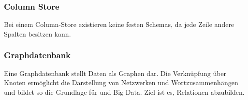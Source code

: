 \subsubsection{Column Store}
Bei einem Column-Store existieren keine festen Schemas, da jede Zeile andere Spalten besitzen kann.

\subsubsection{Graphdatenbank}
Eine Graphdatenbank stellt Daten als Graphen dar. Die Verknüpfung über Knoten ermöglicht die Darstellung von Netzwerken und Wortzusammenhängen und bildet so die Grundlage für  und Big Data. Ziel ist es, Relationen abzubilden.

\newpage
